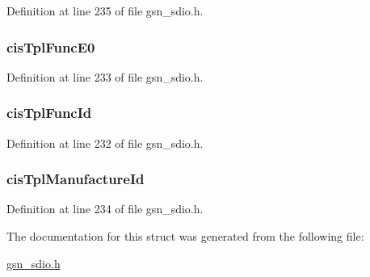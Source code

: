 Definition at line 235 of file gsn\_\-sdio.h.

\hypertarget{a00217_ada7ed5572c3685d8476a9feff469f20b}{
\subsubsection[{cisTplFuncE0}]{ {\bf cisTplFuncE0}}}
\label{a00217_ada7ed5572c3685d8476a9feff469f20b}


Definition at line 233 of file gsn\_\-sdio.h.

\hypertarget{a00217_a0ab47728bbe9b5f06828d5c1d110fb15}{
\subsubsection[{cisTplFuncId}]{ {\bf cisTplFuncId}}}
\label{a00217_a0ab47728bbe9b5f06828d5c1d110fb15}


Definition at line 232 of file gsn\_\-sdio.h.

\hypertarget{a00217_a0ad9c3073be966de94fe1c051b005492}{
\subsubsection[{cisTplManufactureId}]{ {\bf cisTplManufactureId}}}
\label{a00217_a0ad9c3073be966de94fe1c051b005492}


Definition at line 234 of file gsn\_\-sdio.h.



The documentation for this struct was generated from the following file:\begin{DoxyCompactItemize}
\item 
\hyperlink{a00584}{gsn\_\-sdio.h}\end{DoxyCompactItemize}
